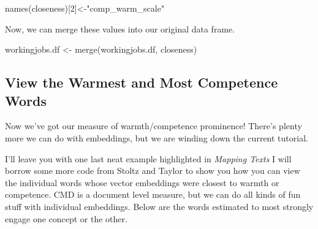 \documentclass[
  letterpaper,
  DIV=11,
  numbers=noendperiod]{scrreprt}
\newenvironment{Shaded}{\begin{snugshade}}{\end{snugshade}}
\newcommand{\DecValTok}[1]{\textcolor[rgb]{0.68,0.00,0.00}{#1}}
\newcommand{\FunctionTok}[1]{\textcolor[rgb]{0.28,0.35,0.67}{#1}}
\newcommand{\NormalTok}[1]{\textcolor[rgb]{0.00,0.23,0.31}{#1}}
\newcommand{\OtherTok}[1]{\textcolor[rgb]{0.00,0.23,0.31}{#1}}
\newcommand{\StringTok}[1]{\textcolor[rgb]{0.13,0.47,0.30}{#1}}
\begin{document}
\begin{Shaded}
\begin{Highlighting}[]
\FunctionTok{names}\NormalTok{(closeness)[}\DecValTok{2}\NormalTok{]}\OtherTok{\textless{}{-}}\StringTok{"comp\_warm\_scale"}
\end{Highlighting}
\end{Shaded}

Now, we can merge these values into our original data frame.

\begin{Shaded}
\begin{Highlighting}[]
\NormalTok{workingjobs.df }\OtherTok{\textless{}{-}} \FunctionTok{merge}\NormalTok{(workingjobs.df, closeness)}
\end{Highlighting}
\end{Shaded}

\subsection{View the Warmest and Most Competence
Words}\label{view-the-warmest-and-most-competence-words}

Now we've got our measure of warmth/competence prominence! There's
plenty more we can do with embeddings, but we are winding down the
current tutorial.

I'll leave you with one last neat example highlighted in \emph{Mapping
Texts} I will borrow some more code from Stoltz and Taylor to show you
how you can view the individual words whose vector embeddings were
closest to warmth or competence. CMD is a document level measure, but we
can do all kinds of fun stuff with individual embeddings. Below are the
words estimated to most strongly engage one concept or the other.
\end{document}
